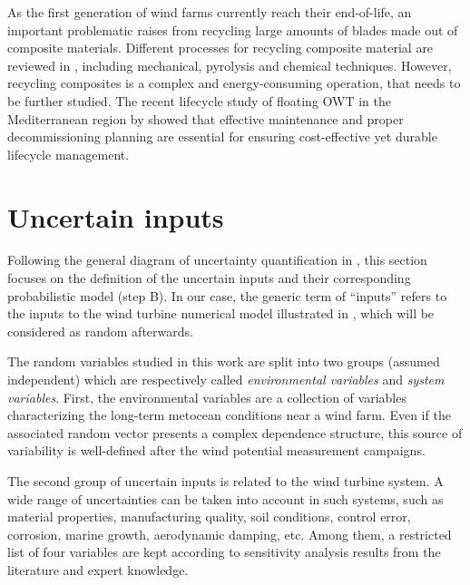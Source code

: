 As the first generation of wind farms currently reach their end-of-life, an important problematic raises from recycling large amounts of blades made out of composite materials. 
Different processes for recycling composite material are reviewed in \citet{jensen_2018_blade_recycling}, including mechanical, pyrolysis and chemical techniques. 
However, recycling composites is a complex and energy-consuming operation, that needs to be further studied. 
The recent lifecycle study of floating OWT in the Mediterranean region by \citet{pulselli_2022_FOWT_lifecycle} showed that effective maintenance and 
proper decommissioning planning are essential for ensuring cost-effective yet durable lifecycle management.  




\section{Uncertain inputs} \label{sec:owt_uncertainties}

Following the general diagram of uncertainty quantification in , this section focuses on the definition of the uncertain inputs and their corresponding probabilistic model (step B). 
In our case, the generic term of ``inputs'' refers to the inputs to the wind turbine numerical model illustrated in , which will be considered as random afterwards. 

The random variables studied in this work are split into two groups (assumed independent) which are respectively called \textit{environmental variables} and \textit{system variables}. 
First, the environmental variables are a collection of variables characterizing the long-term metocean conditions near a wind farm.
Even if the associated random vector presents a complex dependence structure, this source of variability is well-defined after the wind potential measurement campaigns. 

The second group of uncertain inputs is related to the wind turbine system. 
A wide range of uncertainties can be taken into account in such systems, such as material properties, manufacturing quality, soil conditions, control error, corrosion, marine growth, aerodynamic damping, etc.  
Among them, a restricted list of four variables are kept according to sensitivity analysis results from the literature and expert knowledge. 


